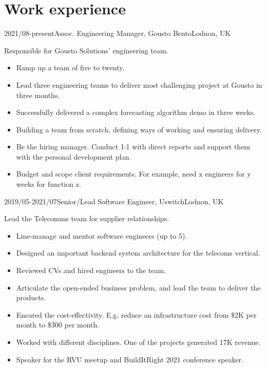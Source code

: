 \documentclass[a4paper]{twentysecondcv-english} %
\begin{document}
\section{Work experience}

\begin{twenty}
	\twentyitem
	    {2021/08-present}{Assoc. Engineering Manager, Gousto Bento}{Lodnon, UK}
    	{Responsible for Gousto Solutions' engineering team.
        	\begin{itemize}
        	    \item Ramp up a team of five to twenty.
        	    \item Lead three engineering teams to deliver most challenging project at Gousto in three months.
                \item Successfully delivered a complex forecasting algorithm demo in three weeks.
                \item Building a team from scratch, defining ways of working and ensuring delivery.
                \item Be the hiring manager. Conduct 1:1 with direct reports and support them with the personal development plan.
                \item Budget and scope client requirements. For example, need x engineers for y weeks for function z.
            \end{itemize}}
	\twentyitem
	    {2019/05-2021/07}{Senior/Lead Software Engineer, Uswitch}{Lodnon, UK}
    	{Lead the Telecomms team for supplier relationships.
        	\begin{itemize}
                \item Line-manage and mentor software engineers (up to 5).
                \item Designed an important backend system architecture for the telecoms vertical.
                \item Reviewed CVs and hired engineers to the team.
                \item Articulate the open-ended business problem, and lead the team to deliver the products.
                \item Ensured the cost-effectivity. E.g. reduce an infrastructure cost from \$2K per month to \$300 per month.
                \item Worked with different disciplines. One of the projects generated \textsterling17K revenue.
                \item Speaker for the RVU meetup and BuildItRight 2021 conference speaker.
                \end{itemize}}

\end{twenty}
\end{document}
